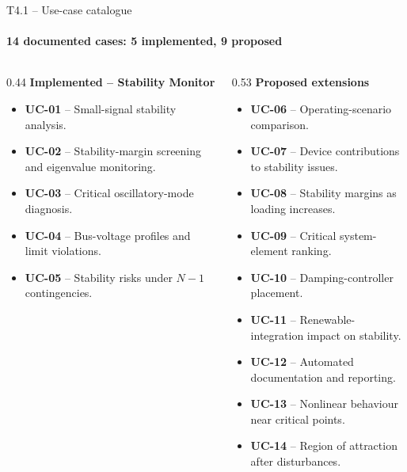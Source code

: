 \documentclass[aspectratio=1609,9pt]{beamer}
\begin{document}
\begin{frame}[t]{T4.1 -- Use-case catalogue}
  \framesubtitle{14 documented cases: 5 implemented, 9 proposed}
  \vspace{1ex}
  \begin{columns}[T,onlytextwidth]
    \begin{column}{0.44\textwidth}
      {\color{tgpetrol}\textbf{Implemented -- Stability Monitor}}
      \small
      \begin{itemize}\setlength{\itemsep}{1.1ex}
        \item \textbf{UC-01} -- Small-signal stability analysis.
        \item \textbf{UC-02} -- Stability-margin screening and eigenvalue monitoring.
        \item \textbf{UC-03} -- Critical oscillatory-mode diagnosis.
        \item \textbf{UC-04} -- Bus-voltage profiles and limit violations.
        \item \textbf{UC-05} -- Stability risks under $N-1$ contingencies.
      \end{itemize}
    \end{column}
    \begin{column}{0.53\textwidth}
      {\color{tgpetrol}\textbf{Proposed extensions}}
      \small
      \begin{itemize}\setlength{\itemsep}{0.5ex}
        \item \textbf{UC-06} -- Operating-scenario comparison.
        \item \textbf{UC-07} -- Device contributions to stability issues.
        \item \textbf{UC-08} -- Stability margins as loading increases.
        \item \textbf{UC-09} -- Critical system-element ranking.
        \item \textbf{UC-10} -- Damping-controller placement.
        \item \textbf{UC-11} -- Renewable-integration impact on stability.
        \item \textbf{UC-12} -- Automated documentation and reporting.
        \item \textbf{UC-13} -- Nonlinear behaviour near critical points.
        \item \textbf{UC-14} -- Region of attraction after disturbances.
      \end{itemize}
    \end{column}
  \end{columns}
  \vfill
\end{frame}
\end{document}
